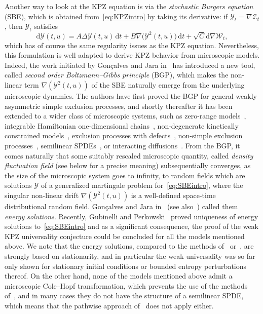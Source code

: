 \documentclass[AHL,Unicode,longabstracts]{cedram}
\newcommand{\mc}[1]{{\mathcal #1}}
\renewcommand{\mc}[1]{{\mathcal #1}}
\newcommand*{\dd}{\mathrm{d}}
\newcommand*{\dt}{\dd t}
\begin{document}
Another way to look at the KPZ equation is via the \emph{stochastic Burgers equation} (SBE), which is obtained from~\eqref{eq:KPZintro} by taking its derivative: if $\mc Y_t = \nabla \mc Z_t$, then $\mc Y_t$ satisfies
\begin{equation}\label{eq:SBEintro}
\dd\mc Y(t,u) = A \Delta \mc Y(t,u)\,\dt + B\nabla \big(\mc Y^2(t,u)\big) \,\dt + \sqrt C \dd\nabla\mc W_t,
\end{equation}
which has of course the same regularity issues as the KPZ equation. Nevertheless, this formulation is well adapted to derive KPZ behavior from microscopic models. Indeed, the work initiated by Gon\c{c}alves and Jara in~\cite{gj2014} has introduced a new tool, called \emph {second order Boltzmann--Gibbs principle} (BGP), which makes the non-linear term $\nabla (\mc Y^2(t,u))$ of the SBE naturally emerge from the underlying microscopic dynamics. The authors have first proved the BGP for general weakly asymmetric simple exclusion processes, and shortly thereafter it has been extended to a wider class of microscopic systems, such as zero-range models~\cite{GJS}, integrable Hamiltonian one-dimensional chains~\cite{GJSi}, non-degenerate kinetically constrained models~\cite{blondel2016}, exclusion processes with defects~\cite{fgsimon2015}, non-simple exclusion processes~\cite{GJLR}, semilinear SPDEs~\cite{Gubinelli2016Hairer}, or interacting diffusions~\cite{Diehl2017}. From the BGP, it comes naturally that some suitably rescaled microscopic quantity, called \emph{density fluctuation field} (see below for a precise meaning) subsequentially converges, as the size of the microscopic system goes to infinity, to random fields which are solutions $\mc Y$ of a generalized martingale problem for~\eqref{eq:SBEintro}, where the singular non-linear drift $\nabla (\mc Y^2(t,u))$ is a well-defined space-time distributional random field. Gon\c{c}alves and Jara in~\cite{gj2014} (see also~\cite{Gubinelli2013}) called them \emph{energy solutions}. Recently, Gubinelli and Perkowski~\cite{Gubinelli2015Energy} proved uniqueness of energy solutions to~\eqref{eq:SBEintro} and as a significant consequence, the proof of the weak KPZ universality conjecture could be concluded for all the models mentioned above. We note that the energy solutions, compared to the methods of~\cite{BerG} or~\cite{Hairer2014,Gubinelli2015Paracontrolled}, are strongly based on stationarity, and in particular the weak universality was so far only shown for stationary initial conditions or bounded entropy perturbations thereof. On the other hand, none of the models mentioned above admit a microscopic Cole--Hopf transformation, which prevents the use of the methods of~\cite{BerG}, and in many cases they do not have the structure of a semilinear SPDE, which means that the pathwise approach of~\cite{Hairer2014,Gubinelli2015Paracontrolled} does not apply either.
\end{document}
